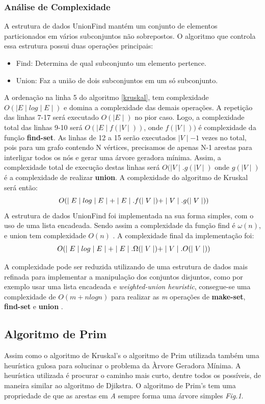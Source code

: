 \documentclass[a4paper,12pt]{article}
\begin{document}
\subsubsection{Análise de Complexidade}
A estrutura de dados UnionFind mantém um conjunto de elementos particionados em vários subconjuntos não sobrepostos. O algoritmo que controla essa estrutura possui duas operações principais:
\begin{itemize}
\item Find: Determina de qual subconjunto um elemento pertence.
\item Union: Faz a união de dois subconjuntos em um só subconjunto.
\end{itemize}

A ordenação na linha 5 do algoritmo \ref{kruskal}, tem complexidade \emph{ $O( \mid E\mid log \mid E\mid )$ } e domina a complexidade das demais operações.
A repetição das linhas 7-17 será executado \emph{$O(\mid E\mid)$} no pior caso.
Logo, a complexidade total das linhas 9-10 será \emph{$O(\mid E\mid f(\mid V\mid))$}, onde $f(\mid V\mid))$ é complexidade da função \textbf{{\color{blue}find-set}}.
As linhas de 12 a 15 serão executados $\mid V\mid -1$ vezes no total, pois para um grafo contendo N vértices, precisamos de apenas N-1 arestas para interligar todos os nós e gerar uma árvore geradora mínima. 
Assim, a complexidade total de execução destas linhas será \emph{ $O(\mid V\mid . g(\mid V\mid)$} onde $g(\mid V\mid)$ é a complexidade de realizar \textbf{{\color{blue}union}}.
A complexidade do algoritmo de Kruskal será então: \[ \emph{ $O(\mid E\mid log \mid E\mid + \mid E\mid .f(\mid V\mid) + \mid V\mid . g(\mid V\mid)) $}\]
A estrutura de dados UnionFind foi implementada na sua forma simples, com o uso de uma lista encadeada. Sendo assim a complexidade da função find é \emph{$\omega(n)$}, e union tem complexidade \emph{$O(n)$} \cite{Cormem}. A complexidade final da implementação foi:
\[ \emph{ $O(\mid E\mid log \mid E\mid + \mid E\mid .\Omega(\mid V\mid) + \mid V\mid . O(\mid V\mid)) $}\]

A complexidade pode ser reduzida utilizando de uma estrutura de dados mais refinada para implementar a manipulação dos conjuntos disjuntos, como por exemplo usar uma lista encadeada e \emph{weighted-union heuristic}\cite{Cormem}, consegue-se uma complexidade de \emph{$O(m+nlogn) $} para realizar as \emph{m} operações de \textbf{{\color{blue}make-set}}, \textbf{{\color{blue}find-set}} e \textbf{{\color{blue}union}} \cite{Cormem}.
\newpage
\subsection{Algoritmo de Prim}
Assim como o algoritmo de Kruskal's o algoritmo de Prim utilizada também uma heurística gulosa para solucinar o problema da Àrvore Geradora Mínima. A heurística utilizada é procurar o caminho mais curto, dentre todos os possíveis, de maneira similar ao algoritmo de Djikstra. O algoritmo de Prim's tem uma propriedade de que as arestas em \emph{A} sempre forma uma árvore simples \emph{Fig.1}.
\end{document}
